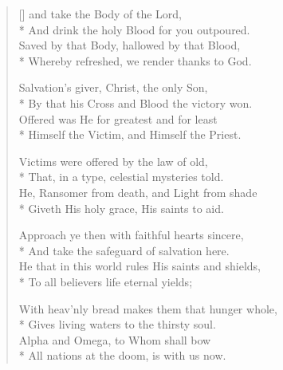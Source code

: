 \newHymn


\begin{verse}[\versewidth]
\pointorig
{} and take the Body of the Lord,\\*
And drink the holy Blood for you outpoured.\\
Saved by that Body, hallowed by that Blood,\\*
Whereby refreshed, we render thanks to God.

Salvation's giver, Christ, the only Son,\\*
By that his Cross and Blood the victory won.\\
Offered was He for greatest and for least\\*
Himself the Victim, and Himself the Priest.

Victims were offered by the law of old,\\*
That, in a type, celestial mysteries told.\\
He, Ransomer from death, and Light from shade\\*
Giveth His holy grace, His saints to aid.

Approach ye then with faithful hearts sincere,\\*
And take the safeguard of salvation here.\\
He that in this world rules His saints and shields,\\*
To all believers life eternal yields;

With heav'nly bread makes them that hunger whole,\\*
Gives living waters to the thirsty soul.\\
Alpha and Omega, to Whom shall bow\\*
All nations at the doom, is with us now.

\end{verse}

\Hmeter{}

